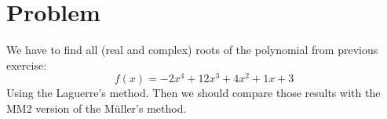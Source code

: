 \section{Problem}
We have to find all (real and complex) roots of the polynomial from previous exercise:
\[ f(x) = -2x^4+12x^3+4x^2+1x+3 \]
Using the Laguerre's method. Then we should compare those results with the MM2 version of the  M{\"u}ller's method.


